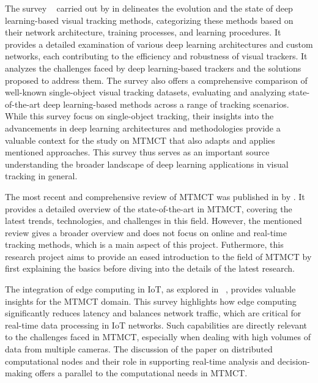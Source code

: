 The survey ~\cite{Zadeh21} carried out by \citeauthor{Zadeh21} in \citeyear{Zadeh21} delineates the evolution and the state of deep learning-based visual tracking methods, categorizing these methods based on their network architecture, training processes, and learning procedures. It provides a detailed examination of various deep learning architectures and custom networks, each contributing to the efficiency and robustness of visual trackers. It analyzes the challenges faced by deep learning-based trackers and the solutions proposed to address them. The survey also offers a comprehensive comparison of well-known single-object visual tracking datasets, evaluating and analyzing state-of-the-art deep learning-based methods across a range of tracking scenarios. While this survey focus on single-object tracking, their insights into the advancements in deep learning architectures and methodologies provide a valuable context for the study on MTMCT that also adapts and applies mentioned approaches. This survey thus serves as an important source understanding the broader landscape of deep learning applications in visual tracking in general.

The most recent and comprehensive review of MTMCT was published in \citeyear{Amosa23} by \textcite{Amosa23}. It provides a detailed overview of the state-of-the-art in MTMCT, covering the latest trends, technologies, and challenges in this field. However, the mentioned review gives a broader overview and does not focus on online and real-time tracking methods, which is a main aspect of this project. Futhermore, this research project aims to provide an eased introduction to the field of MTMCT by first explaining the basics before diving into the details of the latest research.

The integration of edge computing in IoT, as explored in ~\cite{Yu17}, provides valuable insights for the MTMCT domain. This survey highlights how edge computing significantly reduces latency and balances network traffic, which are critical for real-time data processing in IoT networks. Such capabilities are directly relevant to the challenges faced in MTMCT, especially when dealing with high volumes of data from multiple cameras. The discussion of the paper on distributed computational nodes and their role in supporting real-time analysis and decision-making offers a parallel to the computational needs in MTMCT.